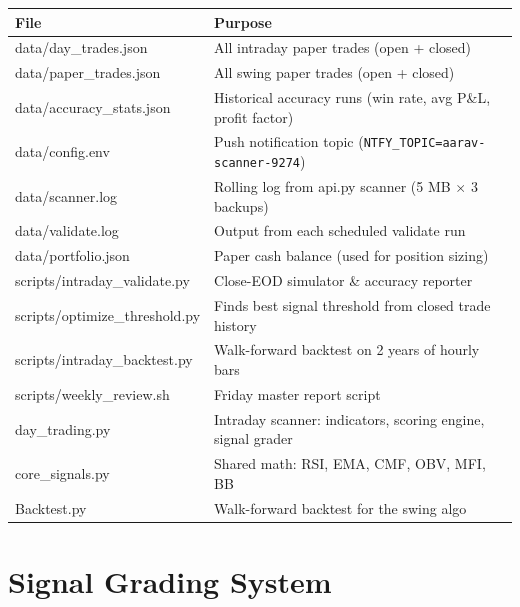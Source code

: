 \documentclass[11pt,a4paper]{article}
\begin{document}
\renewcommand{\arraystretch}{1.45}
\begin{tabularx}{\linewidth}{>{\ttfamily\small}p{5.2cm} X}
  \toprule
  \rowcolor{accent}\color{white}\textbf{File} & \color{white}\textbf{Purpose} \\
  \midrule
  \rowcolor{lightgray} data/day\_trades.json & All intraday paper trades (open + closed) \\
  data/paper\_trades.json & All swing paper trades (open + closed) \\
  \rowcolor{lightgray} data/accuracy\_stats.json & Historical accuracy runs (win rate, avg P\&L, profit factor) \\
  data/config.env & Push notification topic (\texttt{NTFY\_TOPIC=aarav-scanner-9274}) \\
  \rowcolor{lightgray} data/scanner.log & Rolling log from api.py scanner (5 MB $\times$ 3 backups) \\
  data/validate.log & Output from each scheduled validate run \\
  \rowcolor{lightgray} data/portfolio.json & Paper cash balance (used for position sizing) \\
  scripts/intraday\_validate.py & Close-EOD simulator \& accuracy reporter \\
  \rowcolor{lightgray} scripts/optimize\_threshold.py & Finds best signal threshold from closed trade history \\
  scripts/intraday\_backtest.py & Walk-forward backtest on 2 years of hourly bars \\
  \rowcolor{lightgray} scripts/weekly\_review.sh & Friday master report script \\
  day\_trading.py & Intraday scanner: indicators, scoring engine, signal grader \\
  \rowcolor{lightgray} core\_signals.py & Shared math: RSI, EMA, CMF, OBV, MFI, BB \\
  Backtest.py & Walk-forward backtest for the swing algo \\
  \bottomrule
\end{tabularx}

\section{Signal Grading System}
\end{document}
